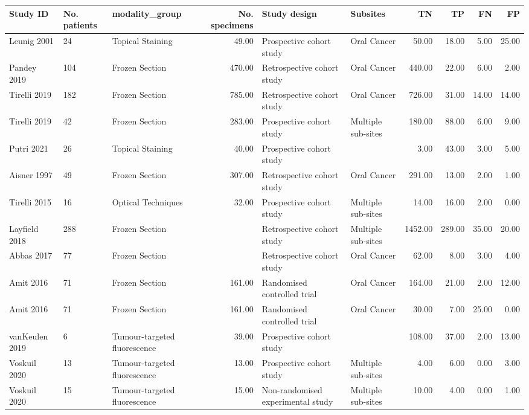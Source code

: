 \begin{table}[ht]
\centering
\begingroup\tiny
\begin{tabular}{lllrllrrrr}
  \hline
Study ID & No. patients & modality\_group & No. specimens & Study design & Subsites & TN & TP & FN & FP \\ 
  \hline
Leunig 2001 & 24 & Topical Staining & 49.00 & Prospective cohort study & Oral Cancer & 50.00 & 18.00 & 5.00 & 25.00 \\ 
  Pandey 2019 & 104 & Frozen Section & 470.00 & Retrospective cohort study & Oral Cancer & 440.00 & 22.00 & 6.00 & 2.00 \\ 
  Tirelli 2019 & 182 & Frozen Section & 785.00 & Retrospective cohort study & Oral Cancer & 726.00 & 31.00 & 14.00 & 14.00 \\ 
  Tirelli 2019 & 42 & Frozen Section & 283.00 & Prospective cohort study & Multiple sub-sites & 180.00 & 88.00 & 6.00 & 9.00 \\ 
  Putri 2021 & 26 & Topical Staining & 40.00 & Prospective cohort study &  & 3.00 & 43.00 & 3.00 & 5.00 \\ 
  Aisner 1997 & 49 & Frozen Section & 307.00 & Retrospective cohort study & Oral Cancer & 291.00 & 13.00 & 2.00 & 1.00 \\ 
  Tirelli 2015 & 16 & Optical Techniques & 32.00 & Prospective cohort study & Multiple sub-sites & 14.00 & 16.00 & 2.00 & 0.00 \\ 
  Layfield 2018 & 288 & Frozen Section &  & Retrospective cohort study & Multiple sub-sites & 1452.00 & 289.00 & 35.00 & 20.00 \\ 
  Abbas 2017 & 77 & Frozen Section &  & Retrospective cohort study & Oral Cancer & 62.00 & 8.00 & 3.00 & 4.00 \\ 
  Amit 2016 & 71 & Frozen Section & 161.00 & Randomised controlled trial & Oral Cancer & 164.00 & 21.00 & 2.00 & 12.00 \\ 
  Amit 2016 & 71 & Frozen Section & 161.00 & Randomised controlled trial & Oral Cancer & 30.00 & 7.00 & 25.00 & 0.00 \\ 
  vanKeulen 2019 & 6 & Tumour-targeted fluorescence & 39.00 & Prospective cohort study &  & 108.00 & 37.00 & 2.00 & 13.00 \\ 
  Voskuil 2020 & 13 & Tumour-targeted fluorescence & 13.00 & Prospective cohort study & Multiple sub-sites & 4.00 & 6.00 & 0.00 & 3.00 \\ 
  Voskuil 2020 & 15 & Tumour-targeted fluorescence & 15.00 & Non-randomised experimental study & Multiple sub-sites & 10.00 & 4.00 & 0.00 & 1.00 \\ 

\end{tabular}
\end{table}
